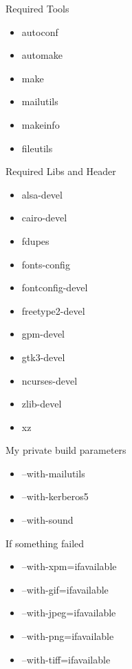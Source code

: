 \begin{frame}{Required Tools}
  \begin{itemize}
  \item{autoconf}
  \item{automake}
  \item{make}
  \item{mailutils}
  \item{makeinfo}
  \item{fileutils}
  \end{itemize}
\end{frame}

\begin{frame}{Required Libs and Header}
  \begin{itemize}
  \item{alsa-devel}
  \item{cairo-devel}
  \item{fdupes}
  \item{fonts-config}
  \item{fontconfig-devel}
  \item{freetype2-devel}
  \item{gpm-devel}
  \item{gtk3-devel}
  \item{ncurses-devel}
  \item{zlib-devel}
  \item{xz}
  \end{itemize}
\end{frame}

\begin{frame}{My private build parameters}
  \begin{itemize}
  \item{--with-mailutils}
  \item{--with-kerberos5}
  \item{--with-sound}
  \end{itemize}
\end{frame}

\begin{frame}{If something failed}
  \begin{itemize}
  \item{--with-xpm=ifavailable}
  \item{--with-gif=ifavailable}
  \item{--with-jpeg=ifavailable}
  \item{--with-png=ifavailable}
  \item{--with-tiff=ifavailable}
  \end{itemize}
\end{frame}


